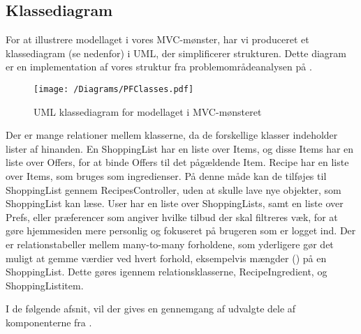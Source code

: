 \subsection{Klassediagram}
For at illustrere modellaget i vores MVC-mønster, har vi produceret et klassediagram (se  nedenfor) i UML, der simplificerer strukturen. 
Dette diagram er en implementation af vores struktur fra problemområdeanalysen på .

\begin{figure}[h]
\centering
 \texttt{[image: /Diagrams/PFClasses.pdf]}
\caption{UML klassediagram for modellaget i MVC-mønsteret}\label{diagram:klassediagram}
\end{figure}

Der er mange relationer mellem klasserne, da de forskellige klasser indeholder lister af hinanden.
En ShoppingList har en liste over Items, og disse Items har en liste over Offers, for at binde Offers til det pågældende Item.
Recipe har en liste over Items, som bruges som ingredienser.
På denne måde kan de tilføjes til ShoppingList gennem RecipesController, uden at skulle lave nye objekter, som ShoppingList kan læse.
User har en liste over ShoppingLists, samt en liste over Prefs, eller præferencer som angiver hvilke tilbud der skal filtreres væk, for at gøre hjemmesiden mere personlig og fokuseret på brugeren som er logget ind.
Der er relationstabeller mellem many-to-many forholdene, som yderligere gør det muligt at gemme værdier ved hvert forhold, eksempelvis mængder () på en ShoppingList.
Dette gøres igennem relationsklasserne, Recipe\textunderscore Ingredient, og ShoppingList\textunderscore item.

I de følgende afsnit, vil der gives en gennemgang af udvalgte dele af komponenterne fra .
